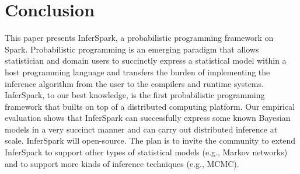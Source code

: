 
\section{Conclusion}
\label{sec:conclusion}

This paper presents InferSpark, 
a probabilistic programming framework  on Spark.
 Probabilistic programming is an emerging paradigm that allows statistician and domain users to succinctly express a statistical model 
 within a host programming language and transfers the burden of
implementing the inference algorithm from the user to the compilers and
runtime systems.
InferSpark, to our best knowledge, is the first probabilistic programming  framework
that builts on top of a distributed computing platform.
Our empirical evaluation shows that InferSpark can successfully express 
some known Bayesian models in a very succinct manner
and can carry out distributed inference at scale.
InferSpark will open-source.  
The plan is to invite the community to extend InferSpark to support other types of 
statistical models (e.g., Markov networks) and to support more kinds of inference techniques 
(e.g., MCMC).

